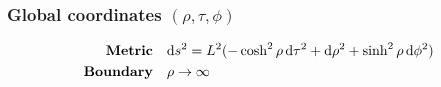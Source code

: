 \documentclass[a4paper,12pt]{article}
\begin{document}
      \subsubsection{Global coordinates \texorpdfstring{$(\rho, \tau, \phi)$}{}}
         \begin{align}
            \text{\textbf{Metric}} &\quad \text{d} s^2 = L^2 (-\cosh^2\rho \, \text{d} \tau^2 + \text{d} \rho^2 + \sinh^2\rho \, \text{d} \phi^2) \\
            \text{\textbf{Boundary}} &\quad \rho \to \infty
         \end{align}
\end{document}
